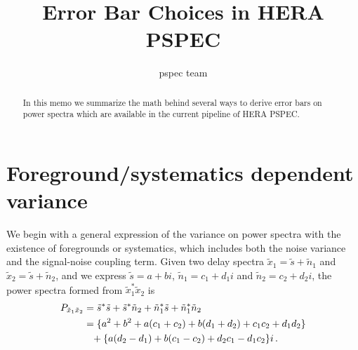 \documentclass[12pt,a4paper]{article}
\title{Error Bar Choices in HERA PSPEC}
\author{pspec team}
\begin{document}
\maketitle{}
\begin{abstract}
    In this memo we summarize the math behind several ways to derive error bars on power spectra which are available in the current pipeline of HERA PSPEC.
\end{abstract}

\section{Foreground/systematics dependent variance}
\label{ap:fg_dependent_var}

We begin with a general expression of the variance on power spectra with the existence of foregrounds or systematics, which includes both the noise variance and the signal-noise coupling term. Given two delay spectra $\tilde{x}_1 = \tilde{s} + \tilde{n}_1$ and $\tilde{x}_2 = \tilde{s} + \tilde{n}_2$, and we express $\tilde{s} = a + b i$, $\tilde{n}_1 = c_1 + d_1 i$ and $\tilde{n}_2 = c_2 + d_2 i$, the power spectra formed from $\tilde{x}_1^* \tilde{x}_2$ is
\begin{align*}
P_{\tilde{x}_1\tilde{x}_2} & = \tilde{s}^*\tilde{s} + \tilde{s}^*\tilde{n}_2 + \tilde{n}_1^*\tilde{s} +
\tilde{n}_1^*\tilde{n}_2 \notag \\
& = \{a^2+b^2 + a(c_1+c_2) + b(d_1+d_2) + c_1c_2 + d_1d_2\} \notag \\
& \phantom{=} + \{a(d_2-d_1)+b(c_1-c_2)+d_2 c_1-d_1 c_2\}i \,.
\end{align*}
\end{document}
